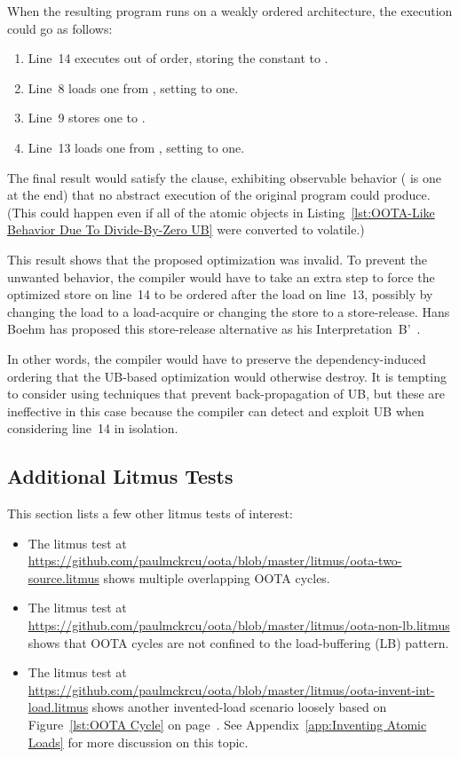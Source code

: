 \documentclass[10]{article}
\begin{document}
When the resulting program runs on a weakly ordered architecture,
the execution could go as follows:
\begin{enumerate}
\item	Line~14 executes out of order, storing the constant  to .
\item	Line~8 loads one from , setting  to one.
\item	Line~9 stores one to .
\item	Line~13 loads one from , setting  to one.
\end{enumerate}
The final result would satisfy the  clause,
exhibiting observable behavior ( is one at the end)
that no abstract execution of the original program could produce.
(This could happen even if all of the atomic objects in
Listing~\ref{lst:OOTA-Like Behavior Due To Divide-By-Zero UB}
were converted to volatile.)

This result shows that the proposed optimization was invalid.
To prevent the unwanted behavior, the compiler would have to take an
extra step to force the optimized store on line~14 to be ordered after
the load on line~13, possibly by changing the load to a load-acquire
or changing the store to a store-release.
Hans Boehm has proposed this store-release alternative as his
Interpretation~B'~\cite{HansBoehm2020UBalternatives}.

In other words, the compiler would have to preserve the dependency-induced
ordering that the UB-based optimization would otherwise destroy.
It is tempting to consider using techniques
that prevent back-propagation of UB, but these are ineffective in this
case because the compiler can detect and exploit UB when
considering line~14 in isolation.

\subsection{Additional Litmus Tests}
\label{app:Additional Litmus Tests}

This section lists a few other litmus tests of interest:

\begin{itemize}
\item	The litmus test at
	\url{https://github.com/paulmckrcu/oota/blob/master/litmus/oota-two-source.litmus}
	shows multiple overlapping OOTA cycles.
\item	The litmus test at
	\url{https://github.com/paulmckrcu/oota/blob/master/litmus/oota-non-lb.litmus}
	shows that OOTA cycles are not confined to the load-buffering (LB)
	pattern.
\item	The litmus test at
	\url{https://github.com/paulmckrcu/oota/blob/master/litmus/oota-invent-int-load.litmus}
	shows another invented-load scenario loosely based on
	Figure~\ref{lst:OOTA Cycle}
	on
	page~\pageref{lst:OOTA Cycle}.
	See Appendix~\ref{app:Inventing Atomic Loads}
	for more discussion on this topic.
\end{itemize}
\end{document}
